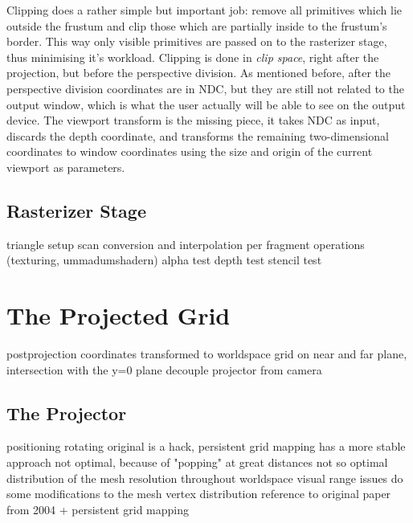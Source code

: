 Clipping does a rather simple but important job: remove all primitives which lie
outside the frustum and clip those which are partially inside to the frustum's
border. This way only visible primitives are passed on to the rasterizer stage,
thus minimising it's workload. Clipping is done in \textit{clip space}, right
after the projection, but before the perspective division. As mentioned before,
after the perspective division coordinates are in NDC, but they are still not
related to the output window, which is what the user actually will be able to
see on the output device. The viewport transform is the missing piece, it takes
NDC as input, discards the depth coordinate, and transforms the remaining
two-dimensional coordinates to window coordinates using the size and origin of
the current viewport as parameters.

\subsection{Rasterizer Stage}

triangle setup
scan conversion and interpolation
per fragment operations (texturing, ummadumshadern)
alpha test
depth test
stencil test

\section{The Projected Grid}

postprojection coordinates transformed to worldspace
grid on near and far plane, intersection with the y=0 plane
decouple projector from camera

\subsection{The Projector}
positioning
rotating
original is a hack, persistent grid mapping has a more stable approach
not optimal, because of "popping" at great distances
not so optimal distribution of the mesh resolution throughout worldspace
visual range issues
do some modifications to the mesh vertex distribution
reference to original paper from 2004 + persistent grid mapping

